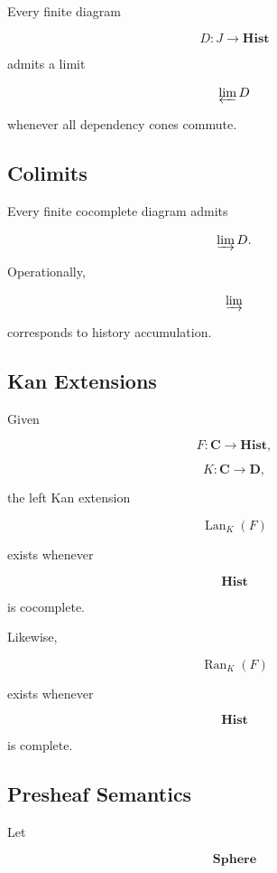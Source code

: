 \documentclass[12pt,oneside]{article}
\theoremstyle{definition}
\theoremstyle{remark}
\begin{document}
Every finite diagram

\[
D:J
\rightarrow
\mathbf{Hist}
\]

admits a limit

\[
\varprojlim D
\]

whenever all dependency cones commute.

\subsection*{Colimits}

Every finite cocomplete diagram admits

\[
\varinjlim D.
\]

Operationally,

\[
\varinjlim
\]

corresponds to history accumulation.

\subsection*{Kan Extensions}

Given

\[
F:\mathbf C\rightarrow\mathbf{Hist},
\]

\[
K:\mathbf C\rightarrow\mathbf D,
\]

the left Kan extension

\[
\operatorname{Lan}_K(F)
\]

exists whenever

\[
\mathbf{Hist}
\]

is cocomplete.

Likewise,

\[
\operatorname{Ran}_K(F)
\]

exists whenever

\[
\mathbf{Hist}
\]

is complete.

\subsection*{Presheaf Semantics}

Let

\[
\mathbf{Sphere}
\]
\end{document}
